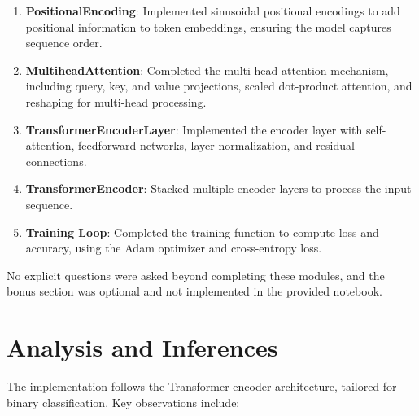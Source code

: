 \documentclass{article}
\begin{document}
\begin{enumerate}
    \item \textbf{PositionalEncoding}: Implemented sinusoidal positional encodings to add positional information to token embeddings, ensuring the model captures sequence order.
    \item \textbf{MultiheadAttention}: Completed the multi-head attention mechanism, including query, key, and value projections, scaled dot-product attention, and reshaping for multi-head processing.
    \item \textbf{TransformerEncoderLayer}: Implemented the encoder layer with self-attention, feedforward networks, layer normalization, and residual connections.
    \item \textbf{TransformerEncoder}: Stacked multiple encoder layers to process the input sequence.
    \item \textbf{Training Loop}: Completed the training function to compute loss and accuracy, using the Adam optimizer and cross-entropy loss.
\end{enumerate}

No explicit questions were asked beyond completing these modules, and the bonus section was optional and not implemented in the provided notebook.

\section{Analysis and Inferences}
The implementation follows the Transformer encoder architecture, tailored for binary classification. Key observations include:
\end{document}
